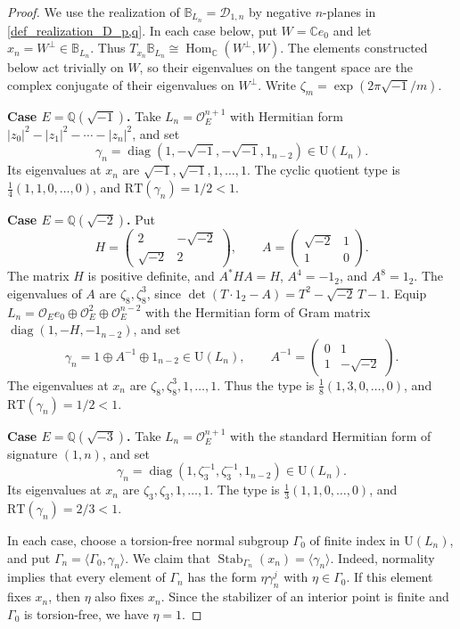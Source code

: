\documentclass[11pt]{amsart}
\theoremstyle{plain}
\theoremstyle{definition}
\numberwithin{equation}{section}
\def\det{\mathop{\mathrm{det}}\nolimits}
\def\OO{\mathscr{O}}
\def\exp{\mathop{\mathrm{exp}}\nolimits}
\def\U{\mathrm{U}}
\newcommand{\bbC}{\mathbb{C}}
\newcommand{\bbQ}{\mathbb{Q}}
\begin{document}
\begin{proof}
We use the realization of
$\mathbb B_{L_n}=\mathcal D_{1,n}$ by negative $n$-planes
in \eqref{def_realization_D_p,q}.
In each case below, put $W=\bbC e_0$ and let
$x_n=W^\perp\in\mathbb B_{L_n}$.
Thus
$T_{x_n}\mathbb B_{L_n}\cong
\operatorname{Hom}_{\bbC}(W^\perp,W)$.
The elements constructed below act trivially on $W$,
so their eigenvalues on the tangent space are the complex conjugate of their eigenvalues on $W^\perp$.
Write $\zeta_m=\exp(2\pi\sqrt{-1}/m)$.

\medskip
\noindent\textbf{Case $E=\bbQ(\sqrt{-1})$.}
Take $L_n=\OO_E^{n+1}$ with Hermitian form
$|z_0|^2-|z_1|^2-\cdots-|z_n|^2$, and set
\[
  \gamma_n
  =\operatorname{diag}
  (1,-\sqrt{-1},-\sqrt{-1},1_{n-2})
  \in\U(L_n).
\]
Its eigenvalues at $x_n$ are
$\sqrt{-1},\sqrt{-1},1,\ldots,1$.
The cyclic quotient type is
$\frac14(1,1,0,\ldots,0)$, and
$\mathrm{RT}(\gamma_n)=1/2<1$.

\medskip
\noindent\textbf{Case $E=\bbQ(\sqrt{-2})$.}
Put
\[
  H=
  \begin{pmatrix}
    2&-\sqrt{-2}\\
    \sqrt{-2}&2
  \end{pmatrix},
  \qquad
  A=
  \begin{pmatrix}
    \sqrt{-2}&1\\
    1&0
  \end{pmatrix}.
\]
The matrix $H$ is positive definite, and
$A^*HA=H$, $A^4=-1_2$, and $A^8=1_2$.
The eigenvalues of $A$ are $\zeta_8,\zeta_8^3$, since
$\det(T\cdot1_2-A)=T^2-\sqrt{-2}\,T-1$.
Equip
$L_n=\OO_E e_0\oplus\OO_E^2\oplus\OO_E^{n-2}$
with the Hermitian form of Gram matrix
$\operatorname{diag}(1,-H,-1_{n-2})$, and set
\[
  \gamma_n=1\oplus A^{-1}\oplus1_{n-2}\in\U(L_n),
  \qquad
  A^{-1}=
  \begin{pmatrix}
    0&1\\
    1&-\sqrt{-2}
  \end{pmatrix}.
\]
The eigenvalues at $x_n$ are
$\zeta_8,\zeta_8^3,1,\ldots,1$.
Thus the type is $\frac18(1,3,0,\ldots,0)$, and
$\mathrm{RT}(\gamma_n)=1/2<1$.

\medskip
\noindent\textbf{Case $E=\bbQ(\sqrt{-3})$.}
Take $L_n=\OO_E^{n+1}$ with the standard Hermitian form
of signature $(1,n)$, and set
\[
  \gamma_n
  =\operatorname{diag}
  (1,\zeta_3^{-1},\zeta_3^{-1},1_{n-2})
  \in\U(L_n).
\]
Its eigenvalues at $x_n$ are
$\zeta_3,\zeta_3,1,\ldots,1$.
The type is $\frac13(1,1,0,\ldots,0)$, and
$\mathrm{RT}(\gamma_n)=2/3<1$.

\medskip
In each case, choose a torsion-free normal subgroup
$\Gamma_0$ of finite index in $\U(L_n)$, and put
$\Gamma_n=\langle\Gamma_0,\gamma_n\rangle$.
We claim that
$\operatorname{Stab}_{\Gamma_n}(x_n)=\langle\gamma_n\rangle$.
Indeed, normality implies that every element of $\Gamma_n$
has the form $\eta\gamma_n^j$ with $\eta\in\Gamma_0$.
If this element fixes $x_n$, then $\eta$ also fixes $x_n$.
Since the stabilizer of an interior point is finite
and $\Gamma_0$ is torsion-free, we have $\eta=1$.


\end{proof}
\end{document}
